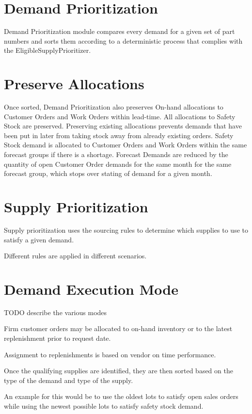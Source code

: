 \documentclass[letterpaper,10pt,english]{sphinxmanual}
\begin{document}
\section{Demand Prioritization}
\label{APS/Introduction:demand-prioritization}
Demand Prioritization module compares every demand for a given set of
part numbers and sorts them according to a deterministic process that complies with
the EligibleSupplyPrioritizer.


\section{Preserve Allocations}
\label{APS/Introduction:preserve-allocations}
Once sorted, Demand Prioritization also preserves On-hand allocations to
Customer Orders and Work Orders within lead-time. All allocations to
Safety Stock are preserved. Preserving existing allocations prevents
demands that have been put in later from taking stock away from already
existing orders. Safety Stock demand is allocated to Customer Orders and
Work Orders within the same forecast groups if there is a shortage.
Forecast Demands are reduced by the quantity of open Customer Order
demands for the same month for the same forecast group, which stops over
stating of demand for a given month.


\section{Supply Prioritization}
\label{APS/Introduction:supply-prioritization}
Supply prioritization uses the sourcing rules to determine which
supplies to use to satisfy a given demand.

Different rules are applied in different scenarios.


\section{Demand Execution Mode}
\label{APS/Introduction:demand-execution-mode}
TODO describe the various modes

Firm customer orders may be allocated to on-hand inventory or to the latest
replenishment prior to request date.

Assignment to replenishments is based on vendor on time performance.

Once the qualifying supplies are identified, they are then sorted based on the type of the
demand and type of the supply.

An example for this would be to use the oldest lots
to satisfy open sales orders while using the newest possible lots to
satisfy safety stock demand.
\end{document}
